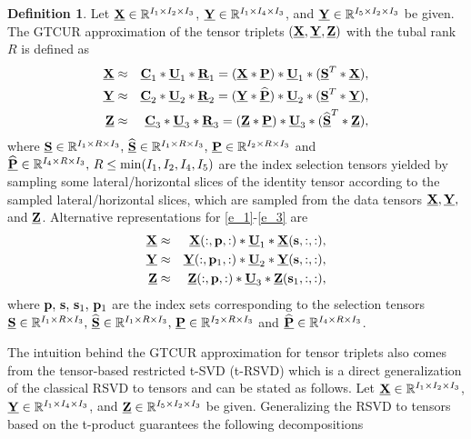 \documentclass[preprint,12pt]{elsarticle}
\theoremstyle{definition}
\newtheorem{defn}{Definition}
\newcommand{\cX}{\underline{\bf X}}
\newcommand{\cY}{\underline{\bf Y}}
\newcommand{\cU}{\underline{\bf U}}
\newcommand{\cZ}{\underline{\bf Z}}
\newcommand{\cR}{\underline{\bf R}}
\newcommand{\cS}{\underline{\bf S}}
\newcommand{\cP}{\underline{\bf P}}
\newcommand{\U}{{\bf U}}
\begin{document}
\begin{defn}
Let $\cX\in\mathbb{R}^{I_1\times I_2\times I_3}$, $\cY\in\mathbb{R}^{I_1\times I_4\times I_3}$, and $\cY\in\mathbb{R}^{I_5\times I_2\times I_3}$ be given. The GTCUR approximation of the tensor triplets $(\cX,\cY,\cZ)$ with the tubal rank $R$ is defined as
\begin{eqnarray}\label{e_1}
\cX &\approx &{\underline{\bf C}}_1*\cU_1*\cR_1 =(\cX*\cP)*\cU_1*({\cS}^T *\cX), \\
\cY &\approx &{\underline{\bf C}}_2*\cU_2*\cR_2 =(\cY*\widehat{\cP})*\cU_2 *({\cS}^T *\cY),\\\label{e_3}
\cZ &\approx&{\underline{\bf C}}_3*\cU_3*\cR_3 =(\cZ*\cP)*\cU_3 *(\widehat{\cS}^T *\cZ),
\end{eqnarray}
where $\underline{\bf S}\in\mathbb{R}^{I_1\times R\times I_3},\,\widehat{\underline{\bf S}}\in\mathbb{R}^{I_1\times R\times I_3},\,\cP\in\mathbb{R}^{I_2\times R\times I_3}$ and $\widehat{\cP}\in\mathbb{R}^{I_4\times R\times I_3},\,R\leq\min(I_1,I_2,I_4,I_5)$ are the index selection tensors yielded by sampling some lateral/horizontal slices of the identity tensor according to the sampled lateral/horizontal slices, which are sampled from the data tensors $\cX,\cY,$ and $\cZ$. Alternative representations for \eqref{e_1}-\eqref{e_3} are
\begin{eqnarray*}
\cX&\approx& \cX(:,{\bf p},:)*\underline{\U}_{1}*\cX({\bf s},:,:),\\
\cY&\approx&\cY(:,{\bf p}_1,:)*\underline{\U}_{2}*\cY({\bf s},:,:),\\
\cZ&\approx&\cZ(:,{\bf p},:)*\underline{\U}_{3}*\cZ({\bf s}_1,:,:),
\end{eqnarray*}
where ${\bf p},\,{\bf s},\,{\bf s}_1,\,{\bf p}_1$
are the index sets corresponding to the  selection tensors $\underline{\bf S}\in\mathbb{R}^{I_1\times R\times I_3},\,\widehat{\underline{\bf S}}\in\mathbb{R}^{I_1\times R\times I_3},\,\cP\in\mathbb{R}^{I_2\times R\times I_3}$ and $\widehat{\cP}\in\mathbb{R}^{I_4\times R\times I_3}$.
\end{defn}
The intuition behind the GTCUR approximation for tensor triplets also comes from the tensor-based restricted t-SVD (t-RSVD) which is a direct generalization of the classical RSVD \cite{zha1991restricted} to tensors and can be stated as follows. Let $\cX\in\mathbb{R}^{I_1\times I_2\times I_3}$, $\cY\in\mathbb{R}^{I_1\times I_4\times I_3}$, and $\cZ\in\mathbb{R}^{I_5\times I_2\times I_3}$ be given. Generalizing the RSVD to tensors based on the t-product guarantees the following decompositions
\end{document}
